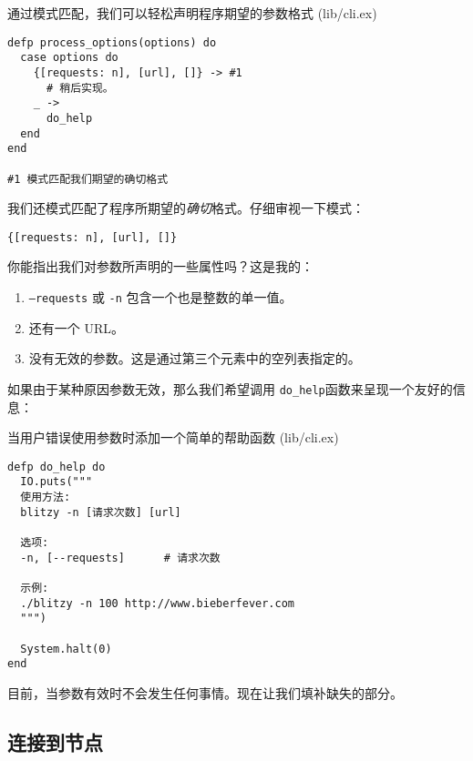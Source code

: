\begin{code}{通过模式匹配，我们可以轻松声明程序期望的参数格式 (lib/cli.ex)}

\begin{verbatim}
defp process_options(options) do
  case options do
    {[requests: n], [url], []} -> #1
      # 稍后实现。
    _ ->
      do_help
  end
end

#1 模式匹配我们期望的确切格式
\end{verbatim}
\end{code}

我们还模式匹配了程序所期望的\emph{确切}格式。仔细审视一下模式：

\begin{code}{}
\begin{verbatim}
{[requests: n], [url], []}
\end{verbatim}
\end{code}

你能指出我们对参数所声明的一些属性吗？这是我的：

\begin{enumerate}
\def\labelenumi{\arabic{enumi}.}
\item  \texttt{--requests} 或 \texttt{-n}  包含一个也是整数的单一值。
\item  还有一个 URL。
\item  没有无效的参数。这是通过第三个元素中的空列表指定的。
\end{enumerate}

如果由于某种原因参数无效，那么我们希望调用 \texttt{do\_help}函数来呈现一个友好的信息：


\begin{code}{当用户错误使用参数时添加一个简单的帮助函数 (lib/cli.ex)}
\begin{verbatim}
defp do_help do
  IO.puts("""
  使用方法:
  blitzy -n [请求次数] [url]

  选项:
  -n, [--requests]      # 请求次数

  示例:
  ./blitzy -n 100 http://www.bieberfever.com
  """)

  System.halt(0)
end
\end{verbatim}
\end{code}

目前，当参数有效时不会发生任何事情。现在让我们填补缺失的部分。

\subsection{连接到节点}

